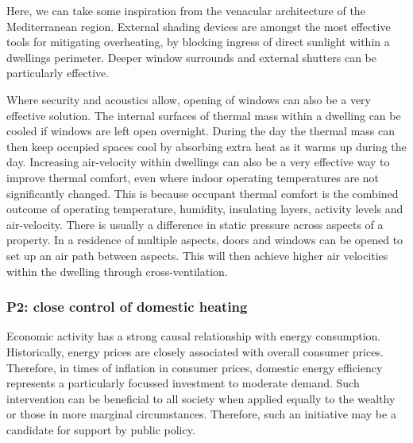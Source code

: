 \documentclass[11pt, oneside]{book}   	%
\begin{document}
Here, we can take some inspiration from the venacular architecture of the Mediterranean region.
External shading devices are amongst the most effective tools for mitigating overheating, by blocking ingress of direct sunlight within a dwellings perimeter.
Deeper window surrounds and external shutters can be particularly effective.\

Where security and acoustics allow, opening of windows can also be a very effective solution.
The internal surfaces of thermal mass within a dwelling can be cooled if windows are left open overnight.
During the day the thermal mass can then keep occupied spaces cool by absorbing extra heat as it warms up during the day.
Increasing air-velocity within dwellings can also be a very effective way to improve thermal comfort, even where indoor operating temperatures are not significantly changed.
This is because occupant thermal comfort is the combined outcome of operating temperature, humidity, insulating layers, activity levels and air-velocity.
There is usually a difference in static pressure across aspects of a property.
In a residence of multiple aspects, doors and windows can be opened to set up an air path between aspects.
This will then achieve higher air velocities within the dwelling through cross-ventilation.\

\subsubsection{P2: close control of domestic heating}
Economic activity has a strong causal relationship with energy consumption.
Historically, energy prices are closely associated with overall consumer prices.
Therefore, in times of inflation in consumer prices, domestic energy efficiency represents a particularly focussed investment to moderate demand.
Such intervention can be beneficial to all society when applied equally to the wealthy or those in more marginal circumstances.
Therefore, such an initiative may be a candidate for support by public policy.\
\end{document}
